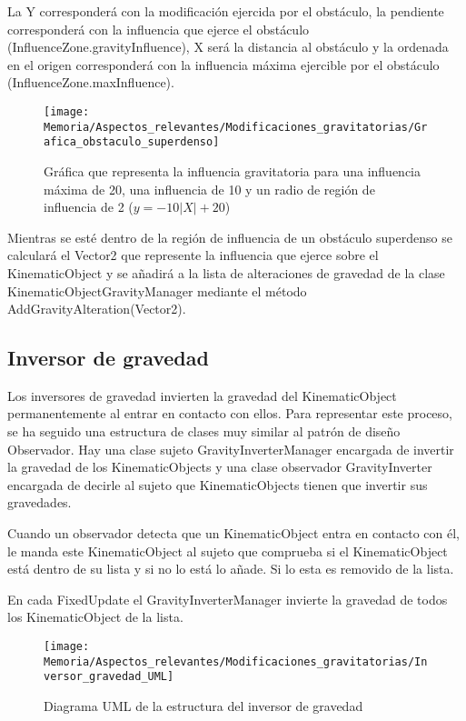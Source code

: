 La Y corresponderá con la modificación ejercida por el obstáculo, la pendiente corresponderá con la influencia que ejerce el obstáculo (InfluenceZone.gravityInfluence), X será la distancia al obstáculo y la ordenada en el origen corresponderá con la influencia máxima ejercible por el obstáculo (InfluenceZone.maxInfluence).

\begin{figure}[h]
\centering
\texttt{[image: Memoria/Aspectos\_relevantes/Modificaciones\_gravitatorias/Grafica\_obstaculo\_superdenso]}
\caption{Gráfica que representa la influencia gravitatoria para una influencia máxima de 20, una influencia de 10 y un radio de región de influencia de 2 ($y = -10|X| + 20$)}
\end{figure}
\clearpage

Mientras se esté dentro de la región de influencia de un obstáculo superdenso se calculará el Vector2 que represente la influencia que ejerce sobre el KinematicObject y se añadirá a la lista de alteraciones de gravedad de la clase KinematicObjectGravityManager mediante el método AddGravityAlteration(Vector2).

\subsection{Inversor de gravedad}
Los inversores de gravedad invierten la gravedad del KinematicObject permanentemente al entrar en contacto con ellos. Para representar este proceso, se ha seguido una estructura de clases muy similar al patrón de diseño Observador. Hay una clase sujeto GravityInverterManager encargada de invertir la gravedad de los KinematicObjects y una clase observador GravityInverter encargada de decirle al sujeto que KinematicObjects tienen que invertir sus gravedades.

Cuando un observador detecta que un KinematicObject entra en contacto con él, le manda este KinematicObject al sujeto que comprueba si el KinematicObject está dentro de su lista y si no lo está lo añade. Si lo esta es removido de la lista.

En cada FixedUpdate el GravityInverterManager invierte la gravedad de todos los KinematicObject de la lista.

\begin{figure}[h]
\centering
\texttt{[image: Memoria/Aspectos\_relevantes/Modificaciones\_gravitatorias/Inversor\_gravedad\_UML]}
\caption{Diagrama UML de la estructura del inversor de gravedad}
\end{figure}

